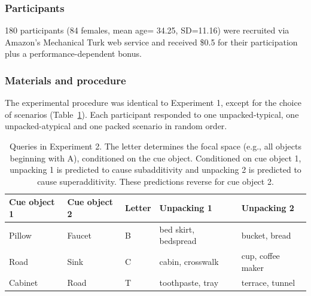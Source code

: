 \subsubsection{Participants}
180 participants (84 females, mean age= 34.25, SD=11.16) were recruited via Amazon's Mechanical Turk web service and received \$0.5 for their participation plus a performance-dependent bonus.

\subsubsection{Materials and procedure}
The experimental procedure was identical to Experiment 1, except for the choice of scenarios (Table~\ref{tab:scenarios2}). Each participant responded to one unpacked-typical, one unpacked-atypical and one packed scenario in random order.

\begin{table}[htbp]
\caption{Queries in Experiment 2. The letter determines the focal space (e.g., all objects beginning with A), conditioned on the cue object. Conditioned on cue object 1, unpacking 1 is predicted to cause subadditivity and unpacking 2 is predicted to cause superadditivity. These predictions reverse for cue object 2.}
\label{tab:scenarios2}
  \begin{center} 
\begin{tabular}{p{} p{} p{} >{\raggedright}p{} >{\raggedright}p{}}
  \toprule
\bf{Cue object 1}&\bf{Cue object 2}&\bf{Letter}&\bf{Unpacking 1} &\bf{Unpacking 2}\tabularnewline
\midrule
Pillow & Faucet & B & bed skirt, bedspread\ & bucket, bread\tabularnewline
Road & Sink & C & cabin, crosswalk & cup, coffee maker\tabularnewline
Cabinet & Road & T & toothpaste, tray & terrace, tunnel\tabularnewline
\bottomrule
\end{tabular}
\end{center}
\end{table}

